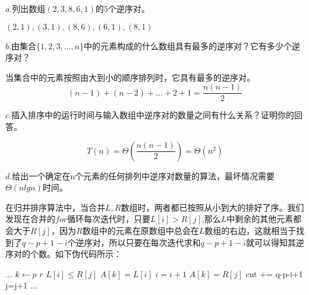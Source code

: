 \documentclass[a4paper,11pt]{article}
\begin{document}
$a.$列出数组$(2,3,8,6,1)$的$5$个逆序对。

$(2,1),(3,1),(8,6),(6,1),(8,1)$

$b.$由集合$\{1,2,3,\dots,n\}$中的元素构成的什么数组具有最多的逆序对？它有多少个逆序对？

当集合中的元素按照由大到小的顺序排列时，它具有最多的逆序对。
\[
	(n-1)+(n-2)+\dots+2+1 = \frac{n(n-1)}{2}
\]

$c.$插入排序中的运行时间与输入数组中逆序对的数量之间有什么关系？证明你的回答。

\[
T(n)=\Theta(\frac{n(n-1)}{2})=\Theta(n^2)
\]

$d.$给出一个确定在n个元素的任何排列中逆序对数量的算法，最坏情况需要$\Theta(nlgn)$时间。

在归并排序算法中，当合并$L,R$数组时，两者都已按照从小到大的排好了序。我们发现在合并的$for$循环每次迭代时，只要$L[i] > R[j]$,那么$L$中剩余的其他元素都会大于$R[j]$，因为$R$数组中的元素在原数组中总会在$L$数组的右边，这就相当于找到了$q-p+1-i$个逆序对，所以只要在每次迭代求和$q-p+1-i$就可以得知其逆序对的个数。如下伪代码所示：
\begin{codebox}
	\zi $\dots$
	\zi \For $k \gets p$ \To $r$
	\zi		\Do
				\If $L[i] \leq R[j]$
	\zi				\Then
					$A[k] = L[i]$
	\zi				$i=i+1$
					\End
	\zi			\Else
	\zi				$A[k] = R[j]$
	\zi				cnt += q-p-i+1
	\zi				j=j+1
				\End	
		\End
	\zi $\dots$
\end{codebox}
\end{document}
